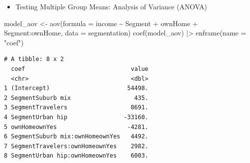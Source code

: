 \documentclass[
  ignorenonframetext,
]{beamer}
\newenvironment{Shaded}{\begin{snugshade}}{\end{snugshade}}
\newcommand{\AttributeTok}[1]{\textcolor[rgb]{0.40,0.45,0.13}{#1}}
\newcommand{\FunctionTok}[1]{\textcolor[rgb]{0.28,0.35,0.67}{#1}}
\newcommand{\NormalTok}[1]{\textcolor[rgb]{0.00,0.23,0.31}{#1}}
\newcommand{\OtherTok}[1]{\textcolor[rgb]{0.00,0.23,0.31}{#1}}
\newcommand{\SpecialCharTok}[1]{\textcolor[rgb]{0.37,0.37,0.37}{#1}}
\newcommand{\StringTok}[1]{\textcolor[rgb]{0.13,0.47,0.30}{#1}}
\providecommand{\tightlist}{%
  \setlength{\itemsep}{0pt}\setlength{\parskip}{0pt}}\usepackage{longtable,booktabs,array}
\begin{document}
\begin{frame}[fragile]{}
\label{section-36}
\begin{itemize}
\tightlist
\item
  Testing Multiple Group Means: Analysis of Variance (ANOVA)
\end{itemize}

\tiny

\begin{Shaded}
\begin{Highlighting}[]
\NormalTok{model\_aov }\OtherTok{\textless{}{-}} \FunctionTok{aov}\NormalTok{(}\AttributeTok{formula =}\NormalTok{ income }\SpecialCharTok{\textasciitilde{}}\NormalTok{ Segment }\SpecialCharTok{+}\NormalTok{ ownHome }\SpecialCharTok{+}\NormalTok{ Segment}\SpecialCharTok{:}\NormalTok{ownHome,}
                 \AttributeTok{data =}\NormalTok{ segmentation)}
\FunctionTok{coef}\NormalTok{(model\_aov) }\SpecialCharTok{|\textgreater{}} \FunctionTok{enframe}\NormalTok{(}\AttributeTok{name =} \StringTok{"coef"}\NormalTok{)}
\end{Highlighting}
\end{Shaded}

\begin{verbatim}
# A tibble: 8 x 2
  coef                              value
  <chr>                             <dbl>
1 (Intercept)                      54498.
2 SegmentSuburb mix                  435.
3 SegmentTravelers                  8691.
4 SegmentUrban hip                -33160.
5 ownHomeownYes                    -4281.
6 SegmentSuburb mix:ownHomeownYes   4492.
7 SegmentTravelers:ownHomeownYes    2982.
8 SegmentUrban hip:ownHomeownYes    6003.
\end{verbatim}
\end{frame}
\end{document}
